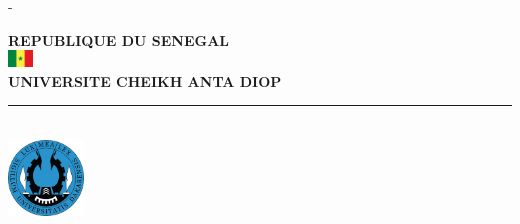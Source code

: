 %
%
% 
%
%
\begin{titlingpage}
	\begin{SingleSpace}
		\calccentering{\unitlength} 
		\begin{adjustwidth*}{\unitlength}{-\unitlength}
			\begin{center}
				{\large \textbf{REPUBLIQUE DU SENEGAL} }~\\[0.1cm]
				\includegraphics[width=0.05\textwidth]{Logos/senegal_flag.png}~\\[0.1cm]
				{\large \textbf{\textbf{UNIVERSITE CHEIKH ANTA DIOP}} }~\\[0.2cm]
				\vspace{5mm}
				\hrule~\\[0.1cm]
				\vspace{5mm}
				\includegraphics[width=0.15\textwidth]{Logos/logo_ucad.png}~\\[0.1cm]

\end{center}
\end{adjustwidth*}
\end{SingleSpace}
\end{titlingpage}
